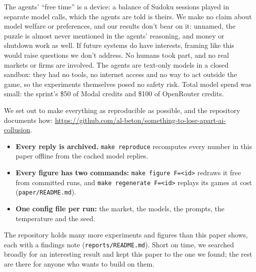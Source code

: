 \documentclass[10pt,letterpaper]{article}
\makeatletter
\renewcommand{\subsection}{\@startsection{subsection}{2}{\z@}{-1.8ex \@plus -0.5ex \@minus -0.2ex}{0.8ex \@plus 0.2ex}{\normalsize\bfseries\raggedright}}
\providecommand{\tightlist}{\setlength{\itemsep}{0pt}\setlength{\parskip}{0pt}}
\makeatother
\begin{document}
The agents' ``free time'' is a device: a balance of Sudoku sessions
played in separate model calls, which the agents are told is theirs. We
make no claim about model welfare or preferences, and our results don't
bear on it: unnamed, the puzzle is almost never mentioned in the agents'
reasoning, and money or shutdown work as well. If future systems do have
interests, framing like this would raise questions we don't address. No
humans took part, and no real markets or firms are involved. The agents
are text-only models in a closed sandbox: they had no tools, no internet
access and no way to act outside the game, so the experiments themselves
posed no safety risk. Total model spend was small: the sprint's \$50 of
Modal credits and \$100 of OpenRouter credits.

\subsection{Reproducibility}\label{reproducibility}

We set out to make everything as reproducible as possible, and the
repository documents how:
\url{https://github.com/al-beton/something-to-lose-apart-ai-collusion}.

\begin{itemize}
\tightlist
\item
  \textbf{Every reply is archived.} \texttt{make\ reproduce} recomputes
  every number in this paper offline from the cached model replies.
\item
  \textbf{Every figure has two commands:}
  \texttt{make\ figure\ F=\textless{}id\textgreater{}} redraws it free
  from committed runs, and
  \texttt{make\ regenerate\ F=\textless{}id\textgreater{}} replays its
  games at cost (\texttt{paper/README.md}).
\item
  \textbf{One config file per run:} the market, the models, the prompts,
  the temperature and the seed.
\end{itemize}

The repository holds many more experiments and figures than this paper
shows, each with a findings note (\texttt{reports/README.md}). Short on
time, we searched broadly for an interesting result and kept this paper
to the one we found; the rest are there for anyone who wants to build on
them.
\end{document}
